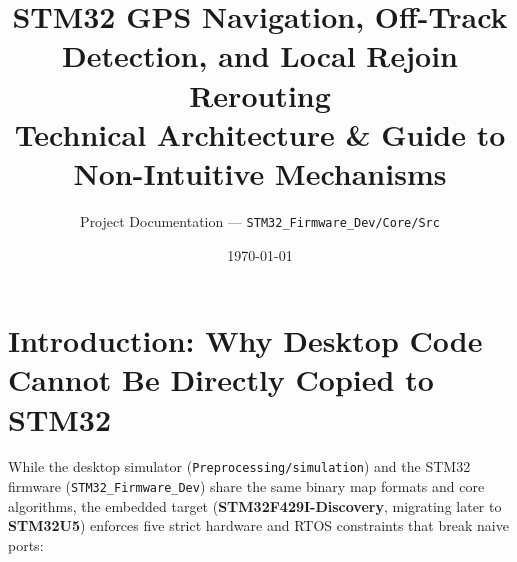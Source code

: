 \documentclass[11pt,a4paper]{article}
\title{\textbf{STM32 GPS Navigation, Off-Track Detection, and Local Rejoin Rerouting}\\
\large Technical Architecture \& Guide to Non-Intuitive Mechanisms}
\author{Project Documentation --- \texttt{STM32\_Firmware\_Dev/Core/Src}}
\date{\today}
\begin{document}
\maketitle
\tableofcontents
\newpage

\section{Introduction: Why Desktop Code Cannot Be Directly Copied to STM32}

While the desktop simulator (\texttt{Preprocessing/simulation}) and the STM32 firmware (\texttt{STM32\_Firmware\_Dev}) share the same binary map formats and core algorithms, the embedded target (\textbf{STM32F429I-Discovery}, migrating later to \textbf{STM32U5}) enforces five strict hardware and RTOS constraints that break naive ports:
\end{document}
